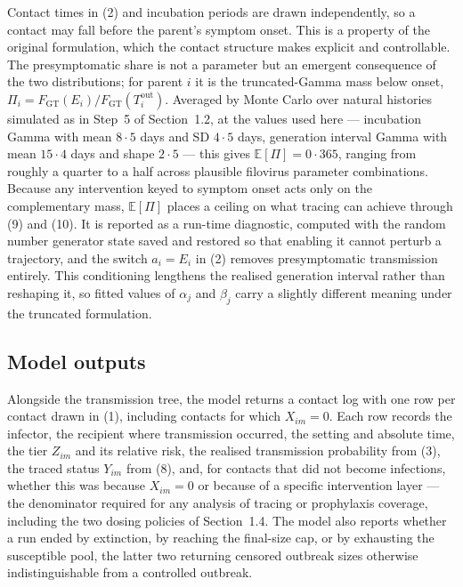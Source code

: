 \documentclass[9pt,letterpaper]{extarticle}
\newcommand{\E}{\mathbb{E}}
\begin{document}
Contact times in (2) and incubation periods are drawn independently, so a contact may fall before the parent's symptom onset. This is a property of the original formulation, which the contact structure makes explicit and controllable. The presymptomatic share is not a parameter but an emergent consequence of the two distributions; for parent $i$ it is the truncated-Gamma mass below onset, $\Pi_i = F_{\mathrm{GT}}(E_i) / F_{\mathrm{GT}}(T_i^{\mathrm{out}})$. Averaged by Monte Carlo over natural histories simulated as in Step~5 of Section~1.2, at the values used here --- incubation Gamma with mean $8{\cdot}5$ days and SD $4{\cdot}5$ days, generation interval Gamma with mean $15{\cdot}4$ days and shape $2{\cdot}5$ --- this gives $\E[\Pi] = 0{\cdot}365$, ranging from roughly a quarter to a half across plausible filovirus parameter combinations. Because any intervention keyed to symptom onset acts only on the complementary mass, $\E[\Pi]$ places a ceiling on what tracing can achieve through (9) and (10). It is reported as a run-time diagnostic, computed with the random number generator state saved and restored so that enabling it cannot perturb a trajectory, and the switch $a_i = E_i$ in (2) removes presymptomatic transmission entirely. This conditioning lengthens the realised generation interval rather than reshaping it, so fitted values of $\alpha_j$ and $\beta_j$ carry a slightly different meaning under the truncated formulation.

\subsection{Model outputs}

Alongside the transmission tree, the model returns a contact log with one row per contact drawn in (1), including contacts for which $X_{im} = 0$. Each row records the infector, the recipient where transmission occurred, the setting and absolute time, the tier $Z_{im}$ and its relative risk, the realised transmission probability from (3), the traced status $Y_{im}$ from (8), and, for contacts that did not become infections, whether this was because $X_{im} = 0$ or because of a specific intervention layer --- the denominator required for any analysis of tracing or prophylaxis coverage, including the two dosing policies of Section~1.4. The model also reports whether a run ended by extinction, by reaching the final-size cap, or by exhausting the susceptible pool, the latter two returning censored outbreak sizes otherwise indistinguishable from a controlled outbreak.
\end{document}
